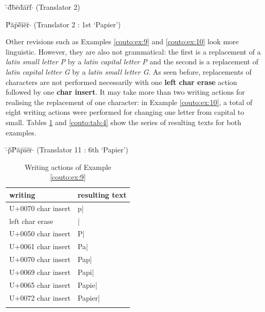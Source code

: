 \documentclass[output=paper]{LSP/langsci}
\begin{document}
\begin{exe}%
	\ex\label{couto:ex:7}$\cdot$\u{ }d\u{ }\uettl\u{ }b\u{ }e\u{ }d\u{ }a\u{ }r\u{ }f\={ }$\cdot$  (Translator 2)
\end{exe}

\begin{exe}%
	\ex\label{couto:ex:8}P\u{ }a\u{ }p\u{ }e\u{ }\uettl\={ }i\u{ }e\u{ }r\u{ }$\cdot$ (Translator 2 : 1st `Papier')
\end{exe}


Other revisions such as Examples \ref{couto:ex:9} and \ref{couto:ex:10} look more linguistic. However, they are also not grammatical: the first is a replacement of a \emph{latin small letter P} by a \emph{latin capital letter P} and the second is a replacement of \emph{latin capital letter G} by a \emph{latin small letter G}. As seen before, replacements of characters are not performed necessarily with one \textbf{left char erase} action followed by one \textbf{char insert}. It may take more than two writing actions for realising the replacement of one character: in Example \ref{couto:ex:10}, a total of eight writing actions were performed for changing one letter from capital to small. Tables \ref{couto:tab:3} and \ref{couto:tab:4} show the series of resulting texts for both examples.

\begin{exe}%
	\ex\label{couto:ex:9}$\cdot$\={ }p\={ }\uettl\u{ }P\u{ }a\u{ }p\u{ }i\u{ }e\u{ }r\u{ }$\cdot$ (Translator 11 : 6th `Papier')
\end{exe}

\begin{table}%
	\centering
	\begin{tabularx}{\textwidth}{XX}
		\lsptoprule
		writing & resulting text \\
\midrule
		U+0070 char insert & p| \\
		\hline
		\hline
		left char erase & | \\
		\hline
		U+0050 char insert & P| \\
		\hline
		U+0061 char insert & Pa| \\
		\hline
		U+0070 char insert & Pap| \\
		\hline
		U+0069 char insert & Papi| \\
		\hline
		U+0065 char insert & Papie| \\
		\hline
		U+0072 char insert & Papier| \\
		\lspbottomrule
	\end{tabularx}
	\caption{Writing actions of Example \ref{couto:ex:9}}
	\label{couto:tab:3}
\end{table}
\end{document}
